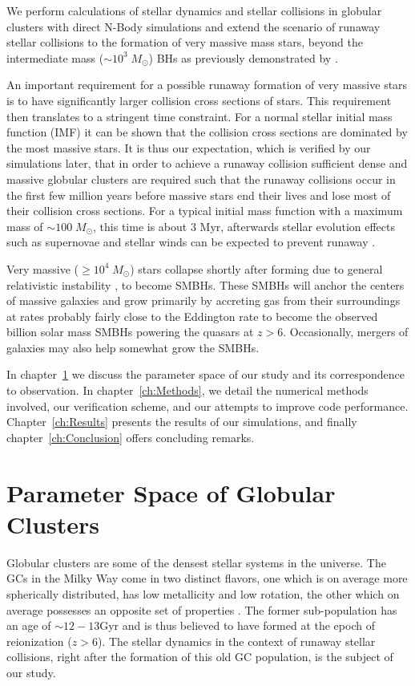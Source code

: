 \documentclass{princeton_astro_thesis}
\newcommand\Msun{\; M_\odot}
\newcommand\msun{\; M_\odot}
\newcommand\Myr{\mbox{ Myr}}
\numberwithin{equation}{section}
\begin{document}
We perform calculations of stellar dynamics and stellar collisions in globular clusters with direct N-Body simulations 
and extend the scenario of runaway stellar collisions to 
the formation of very massive mass stars, beyond the intermediate mass ($\sim 10^3\msun$) BHs 
as previously demonstrated by \citet{2004SPZ}.

An important requirement for a possible runaway formation of very massive stars
is to have significantly larger collision cross sections of stars.
This requirement then translates to 
a stringent time constraint.
For a normal stellar initial mass function (IMF)
it can be shown that the collision cross sections are dominated by the most massive stars.
It is thus our expectation, which is verified by our simulations later,
that in order to achieve a runaway collision sufficient dense and massive globular clusters
are required such that the runaway collisions occur in the first few million years before
massive stars end their lives and lose most of their collision cross sections.
For a typical initial mass function with a maximum mass of $\sim100 \Msun$, this time is about $3 \Myr$, 
afterwards stellar evolution effects such as supernovae and stellar winds can be expected to prevent runaway \citep{2002SPZ}. 

Very massive ($\ge 10^4\msun$) stars collapse shortly after forming due to general relativistic instability \citep{1964Chandrasekhar},
to become SMBHs.
These SMBHs will anchor the centers of massive galaxies 
and grow primarily by accreting gas from their surroundings at rates probably fairly close to the Eddington rate
to become the observed billion solar mass SMBHs powering the quasars at $z>6$.
Occasionally, mergers of galaxies may also help somewhat grow the SMBHs.

In chapter~\ref{ch:Model} we discuss the parameter space of our study and its correspondence to observation.  In chapter~\ref{ch:Methods}, we detail the numerical methods involved, our verification scheme, and our attempts to improve code performance. Chapter~\ref{ch:Results} presents the results of our simulations, and finally chapter~\ref{ch:Conclusion} offers concluding remarks.

\chapter{Parameter Space of Globular Clusters}
\label{ch:Model}

Globular clusters are some of the densest stellar systems in the universe. 
The GCs in the Milky Way come in two distinct flavors,
one which is on average more spherically distributed, has low metallicity 
and low rotation, the other which on average possesses an opposite set of properties
\citep[][]{1985Zinn}.
The former sub-population has an age of $\sim 12-13$Gyr and is thus believed
to have formed at the epoch of reionization ($z>6$).
The stellar dynamics in the context of runaway stellar collisions,
right after the formation of this old GC population, is the subject of our study.
\end{document}
